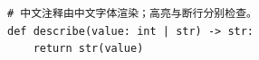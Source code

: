 \documentclass[UTF8,fontset=fandol]{ctexart}
\begin{document}
\begin{verbatim}
# 中文注释由中文字体渲染；高亮与断行分别检查。
def describe(value: int | str) -> str:
    return str(value)
\end{verbatim}
\end{document}
